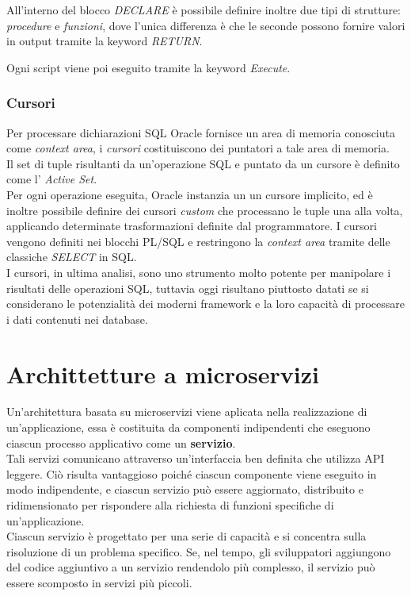 All'interno del blocco \textit{DECLARE} è possibile definire inoltre due tipi di strutture: \textit{procedure} e \textit{funzioni}, dove l'unica differenza è che le seconde possono fornire valori in output tramite la keyword \textit{RETURN}.

Ogni script viene poi eseguito tramite la keyword \textit{Execute}.

\subsubsection{Cursori}
Per processare dichiarazioni SQL Oracle fornisce un area di memoria conosciuta come \textit{context area}, i \textit{cursori} costituiscono dei puntatori a tale area di memoria.\\
Il set di tuple risultanti da un'operazione SQL e puntato da un cursore è definito come l' \textit{Active Set}.\\
Per ogni operazione eseguita, Oracle instanzia un un cursore implicito, ed è inoltre possibile definire dei cursori \textit{custom} che processano le tuple una alla volta, applicando determinate trasformazioni definite dal programmatore.
I cursori vengono definiti nei blocchi PL/SQL e restringono la \textit{context area} tramite delle classiche \textit{SELECT} in SQL.\\
I cursori, in ultima analisi, sono uno strumento molto potente per manipolare i risultati delle operazioni SQL, tuttavia oggi risultano piuttosto datati se si considerano le potenzialità dei moderni \gls{framework} e la loro capacità di processare i dati contenuti nei database.

\section{Archittetture a microservizi}
Un’architettura basata su microservizi viene aplicata nella realizzazione di un’applicazione, essa è costituita da componenti indipendenti che eseguono ciascun processo applicativo come un \textbf{servizio}.\\
Tali servizi comunicano attraverso un’interfaccia ben definita che utilizza API leggere. Ciò risulta vantaggioso poiché ciascun componente viene eseguito in modo indipendente, e ciascun servizio può essere aggiornato, distribuito e ridimensionato per rispondere alla richiesta di funzioni specifiche di un’applicazione.\\
Ciascun servizio è progettato per una serie di capacità e si concentra sulla risoluzione di un problema specifico. Se, nel tempo, gli sviluppatori aggiungono del codice aggiuntivo a un servizio rendendolo più complesso, il servizio può essere scomposto in servizi più piccoli.

